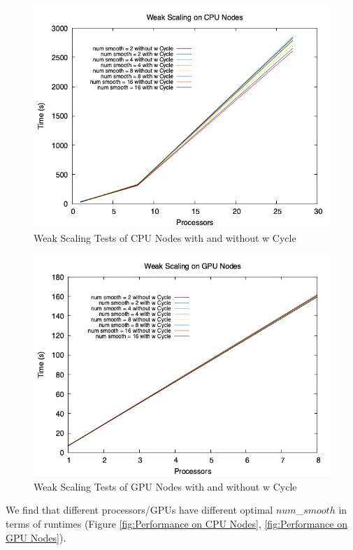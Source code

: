 \documentclass{article}
\begin{document}
\begin{figure}[H]
        \includegraphics[width=\textwidth]{Weak Scaling on CPU Nodes.png}
        \caption{Weak Scaling Tests of CPU Nodes with and without w Cycle}  
        \label{fig:CPU nodes with and without w cycle}
\end{figure}
\begin{figure}[H]
        \includegraphics[width=\textwidth]{Weak Scaling on GPU Nodes.png}
        \caption{Weak Scaling Tests of GPU Nodes with and without w Cycle}  
        \label{fig:GPU nodes with and without w cycle}
\end{figure}

We find that different processors/GPUs have different optimal $num$\_$smooth$ in terms of runtimes (Figure \ref{fig:Performance on CPU Nodes}, \ref{fig:Performance on GPU Nodes}).
\end{document}
